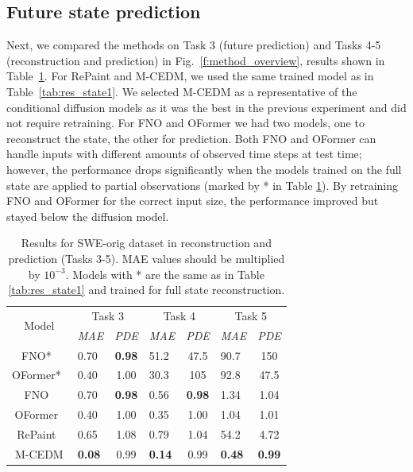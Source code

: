 \documentclass{article}
\begin{document}
\subsection{Future state prediction}
Next, we compared the methods on Task 3 (future prediction) and Tasks 4-5 (reconstruction and prediction) in Fig.~\ref{f:method_overview}, results shown in Table~\ref{tab:res_time_pred}. For RePaint and M-CEDM, we used the same trained model as in Table~\ref{tab:res_state1}. We selected M-CEDM as a representative of the conditional diffusion models as it was the best in the previous experiment and did not require retraining. For FNO and OFormer we had two models, one to reconstruct the state, the other for prediction. Both FNO and OFormer can handle inputs with different amounts of observed time steps at test time; however, the performance drops significantly when the models trained on the full state are applied to partial observations (marked by * in Table \ref{tab:res_time_pred}). By retraining FNO and OFormer for the correct input size, the performance improved but stayed below the diffusion model. 


\begin{table}[t]
\caption{
Results for SWE-orig dataset in reconstruction and prediction (Tasks 3-5). MAE values should be multiplied by $10^{-3}$. Models with * are the same as in Table \ref{tab:res_state1} and trained for full state reconstruction.
}
\label{tab:res_time_pred}
\begin{center}
\begin{tabular}{@{}c|p{0.5cm}c|p{0.5cm}c|p{0.5cm}c}
\multirow{2}{*}{Model}                         & \multicolumn{2}{c|}{Task 3} & \multicolumn{2}{c|}{Task 4} & \multicolumn{2}{c}{Task 5}
\\
                                               & \textit{MAE} & \textit{PDE} & \textit{MAE} & \textit{PDE} & \textit{MAE} & \textit{PDE} 
\\
\hline
FNO*~\cite{li2021fourier}                      & 0.70 & \textbf{0.98} & 51.2 & 47.5 & 90.7 & 150 \\
OFormer*~\cite{li2023transformer}              & 0.40 & 1.00 & 30.3 & 105 & 92.8 & 47.5 \\
FNO~\cite{li2021fourier}                       & 0.70 & \textbf{0.98} & 0.56 & \textbf{0.98} & 1.34 & 1.04 \\
OFormer~\cite{li2023transformer}               & 0.40 & 1.00 & 0.35 & 1.00 & 1.04 & 1.01 \\
RePaint~\cite{lugmayr2022repaint}              & 0.65 & 1.08 & 0.79 & 1.04 & 54.2 & 4.72 \\
\hline
M-CEDM                                         & \textbf{0.08} & 0.99 & \textbf{0.14} & 0.99 & \textbf{0.48} & \textbf{0.99}  \\
\end{tabular}
\end{center}
\end{table}
 
\end{document}
